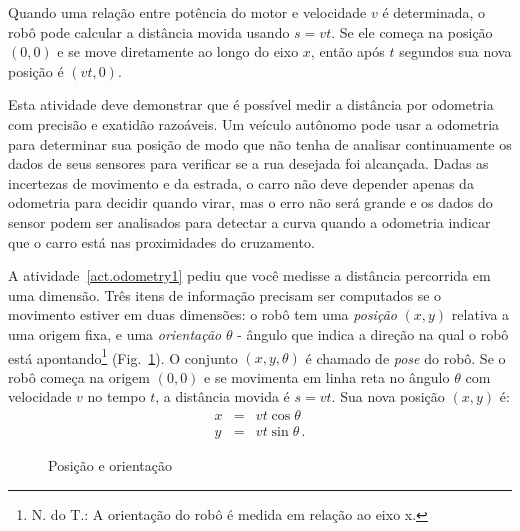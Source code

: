 Quando uma relação entre potência do motor e velocidade $v$ é determinada, o robô pode calcular a distância movida usando $s=vt$. Se ele começa na posição $(0,0)$ e se move diretamente ao longo do eixo $x$, então após $t$ segundos sua nova posição é $(vt,0)$.

Esta atividade deve demonstrar que é possível medir a distância por odometria com precisão e exatidão razoáveis. Um veículo autônomo pode usar a odometria para determinar sua posição de modo que não tenha de analisar continuamente os dados de seus sensores para verificar se a rua desejada foi alcançada. Dadas as incertezas de movimento e da estrada, o carro não deve depender apenas da odometria para decidir quando virar, mas o erro não será grande e os dados do sensor podem ser analisados para detectar a curva quando a odometria indicar que o carro está nas proximidades do cruzamento.

A atividade~\ref{act.odometry1} pediu que você medisse a distância percorrida em uma dimensão. Três itens de informação precisam ser computados se o movimento estiver em duas dimensões: o robô tem uma \emph{posição} $(x,y)$ relativa a uma origem fixa, e uma \emph{orientação} $\theta$ - ângulo que indica a direção na qual o robô está apontando\footnote{N. do T.: A orientação do robô é medida em relação ao eixo x.} (Fig.~\ref{fig.pos-head}). O conjunto $(x,y,\theta)$ é chamado de \emph{pose} do robô. Se o robô começa na origem $(0,0)$ e se movimenta em linha reta no ângulo $\theta$ com velocidade $v$ no tempo $t$, a distância movida é $s=vt$. Sua nova posição $(x,y)$ é:
\begin{eqnarray*}
x &=& vt \cos \theta\\
y &=& vt \sin \theta\,.
\end{eqnarray*}

\begin{figure}
\begin{center}
\caption{Posição e orientação}\label{fig.pos-head}
\end{center}
\end{figure}


